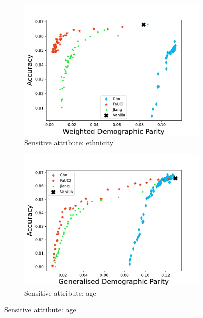 \begin{figure}
\begin{subfigure}[]{\onethirdsize}
        \centering
        \includegraphics[width=\columnwidth]{figures/fauci/accuracy/demographic_parity_ethnicity}
        \caption{Sensitive attribute: ethnicity}
        \label{fig:dp-ethnicity}
    \end{subfigure}
    \begin{subfigure}[]{\onethirdsize}
        \centering
        \includegraphics[width=\columnwidth]{figures/fauci/accuracy/demographic_parity_age}
        \caption{Sensitive attribute: age}
        \label{fig:dp-age}
    \end{subfigure}
    \label{fig:dp}


\end{figure}
